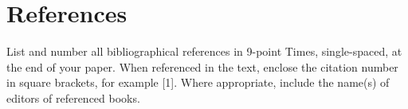 \documentclass[twocolumn,letterpaper,10pt]{article}
\begin{document}
\balance

\section{References}
     
List and number all bibliographical references in 9-point Times,
single-spaced, at the end of your paper. When referenced in the text,
enclose the citation number in square brackets, for example [1]. Where
appropriate, include the name(s) of editors of referenced books.
\nocite{Smith,Jones}

\vspace*{-6ex}
 

\end{document}

